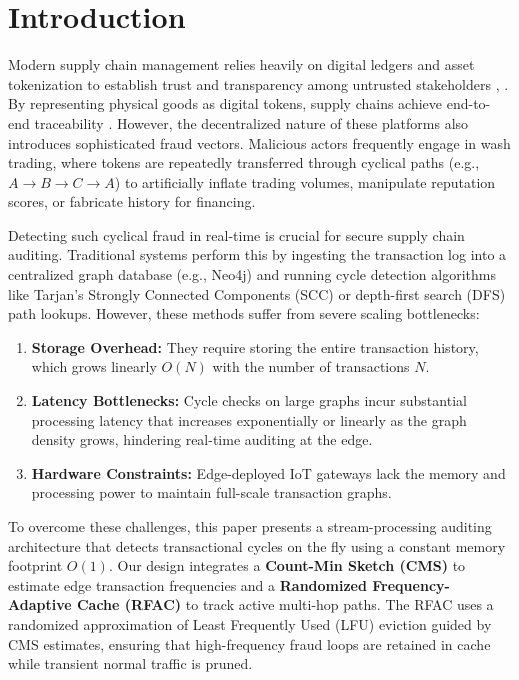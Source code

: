 \documentclass[conference]{IEEEtran}
\begin{document}
\section{Introduction}
Modern supply chain management relies heavily on digital ledgers and asset tokenization to establish trust and transparency among untrusted stakeholders \cite{b2}, \cite{b10}. By representing physical goods as digital tokens, supply chains achieve end-to-end traceability \cite{b1}. However, the decentralized nature of these platforms also introduces sophisticated fraud vectors. Malicious actors frequently engage in wash trading, where tokens are repeatedly transferred through cyclical paths (e.g., $A \to B \to C \to A$) to artificially inflate trading volumes, manipulate reputation scores, or fabricate history for financing.

Detecting such cyclical fraud in real-time is crucial for secure supply chain auditing. Traditional systems perform this by ingesting the transaction log into a centralized graph database (e.g., Neo4j) and running cycle detection algorithms like Tarjan's Strongly Connected Components (SCC) or depth-first search (DFS) path lookups. However, these methods suffer from severe scaling bottlenecks:
\begin{enumerate}
    \item \textbf{Storage Overhead:} They require storing the entire transaction history, which grows linearly $O(N)$ with the number of transactions $N$.
    \item \textbf{Latency Bottlenecks:} Cycle checks on large graphs incur substantial processing latency that increases exponentially or linearly as the graph density grows, hindering real-time auditing at the edge.
    \item \textbf{Hardware Constraints:} Edge-deployed IoT gateways lack the memory and processing power to maintain full-scale transaction graphs.
\end{enumerate}

To overcome these challenges, this paper presents a stream-processing auditing architecture that detects transactional cycles on the fly using a constant memory footprint $O(1)$. Our design integrates a \textbf{Count-Min Sketch (CMS)} to estimate edge transaction frequencies and a \textbf{Randomized Frequency-Adaptive Cache (RFAC)} to track active multi-hop paths. The RFAC uses a randomized approximation of Least Frequently Used (LFU) eviction guided by CMS estimates, ensuring that high-frequency fraud loops are retained in cache while transient normal traffic is pruned.
\end{document}
